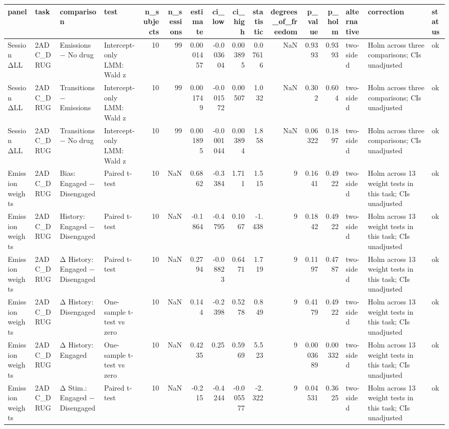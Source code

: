 \begin{tabular}{llllrrrrrrrrrlll}
\toprule
panel & task & comparison & test & n\_subjects & n\_sessions & estimate & ci\_low & ci\_high & statistic & degrees\_of\_freedom & p\_value & p\_holm & alternative & correction & status \\
\midrule
Session ΔLL & 2ADC\_DRUG & Emissions − No drug & Intercept-only LMM: Wald z & 10 & 99 & 0.0001457 & -0.003604 & 0.003895 & 0.07616 & NaN & 0.9393 & 0.9393 & two-sided & Holm across three comparisons; CIs unadjusted & ok \\
Session ΔLL & 2ADC\_DRUG & Transitions − Emissions & Intercept-only LMM: Wald z & 10 & 99 & 0.001749 & -0.001572 & 0.00507 & 1.032 & NaN & 0.302 & 0.604 & two-sided & Holm across three comparisons; CIs unadjusted & ok \\
Session ΔLL & 2ADC\_DRUG & Transitions − No drug & Intercept-only LMM: Wald z & 10 & 99 & 0.001895 & -0.0001044 & 0.003894 & 1.858 & NaN & 0.06322 & 0.1897 & two-sided & Holm across three comparisons; CIs unadjusted & ok \\
Emission weights & 2ADC\_DRUG & Bias: Engaged − Disengaged & Paired t-test & 10 & NaN & 0.6862 & -0.3384 & 1.711 & 1.515 & 9 & 0.1641 & 0.4922 & two-sided & Holm across 13 weight tests in this task; CIs unadjusted & ok \\
Emission weights & 2ADC\_DRUG & History: Engaged − Disengaged & Paired t-test & 10 & NaN & -0.1864 & -0.4795 & 0.1067 & -1.438 & 9 & 0.1842 & 0.4922 & two-sided & Holm across 13 weight tests in this task; CIs unadjusted & ok \\
Emission weights & 2ADC\_DRUG & Δ History: Engaged − Disengaged & Paired t-test & 10 & NaN & 0.2794 & -0.08823 & 0.6471 & 1.719 & 9 & 0.1197 & 0.4787 & two-sided & Holm across 13 weight tests in this task; CIs unadjusted & ok \\
Emission weights & 2ADC\_DRUG & Δ History: Disengaged & One-sample t-test vs zero & 10 & NaN & 0.144 & -0.2398 & 0.5278 & 0.849 & 9 & 0.4179 & 0.4922 & two-sided & Holm across 13 weight tests in this task; CIs unadjusted & ok \\
Emission weights & 2ADC\_DRUG & Δ History: Engaged & One-sample t-test vs zero & 10 & NaN & 0.4235 & 0.25 & 0.5969 & 5.523 & 9 & 0.0003689 & 0.00332 & two-sided & Holm across 13 weight tests in this task; CIs unadjusted & ok \\
Emission weights & 2ADC\_DRUG & Δ Stim.: Engaged − Disengaged & Paired t-test & 10 & NaN & -0.215 & -0.4244 & -0.005577 & -2.322 & 9 & 0.04531 & 0.3625 & two-sided & Holm across 13 weight tests in this task; CIs unadjusted & ok \\

\end{tabular}
